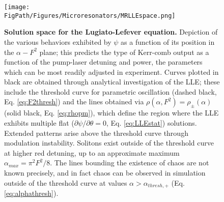 \begin{figure}[htpb]
	\begin{center}
		\texttt{[image: \\FigPath/Figures/Microresonators/MRLLEspace.png]}
	\end{center}
	\caption[Solution space for the Lugiato-Lefever equation]{\textbf{Solution space for the Lugiato-Lefever equation.} Depiction of the various behaviors exhibited by $\psi$ as a function of its position in the $\alpha-F^2$ plane; this predicts the type of Kerr-comb output as a function of the pump-laser detuning and power, the parameters which can be most readily adjusted in experiment. Curves plotted in black are obtained through analytical investigation of the LLE; these include the threshold curve for parametric oscillation (dashed black, Eq. \ref{eq:F2thresh}) and the lines obtained via $\rho(\alpha,F^2)=\rho_\pm(\alpha)$ (solid black, Eq. \ref{eq:rhopm}), which define the region where the LLE exhibits multiple flat ($\partial \psi/\partial \theta=0$, Eq. \ref{eq:LLEstat}) solutions. Extended patterns arise above the threshold curve through modulation instability. Solitons exist outside of the threshold curve at higher red detuning, up to an approximate maximum $\alpha_{max}=\pi^2 F^2/8$. The lines bounding the existence of chaos are not known precisely, and in fact chaos can be observed in simulation outside of the threshold curve at values $\alpha>\alpha_{thresh,+}$ (Eq. \ref{eq:alphathresh}).
	 }
	
	\label{fig:MRLLEspace}
\end{figure} 


%

